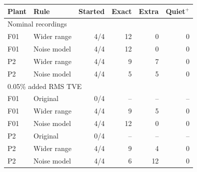 \begin{tabular}{llrrrr}\hline
Plant & Rule & Started & Exact & Extra & Quiet$^+$\\\hline
\multicolumn{6}{l}{Nominal recordings}\\
F01 & Wider range & 4/4 & 12 & 0 & 0\\
F01 & Noise model & 4/4 & 12 & 0 & 0\\
P2 & Wider range & 4/4 & 9 & 7 & 0\\
P2 & Noise model & 4/4 & 5 & 5 & 0\\
\multicolumn{6}{l}{0.05\% added RMS TVE}\\
F01 & Original & 0/4 & -- & -- & --\\
F01 & Wider range & 4/4 & 9 & 5 & 0\\
F01 & Noise model & 4/4 & 12 & 0 & 0\\
P2 & Original & 0/4 & -- & -- & --\\
P2 & Wider range & 4/4 & 9 & 4 & 0\\
P2 & Noise model & 4/4 & 6 & 12 & 0\\
\hline\end{tabular}
